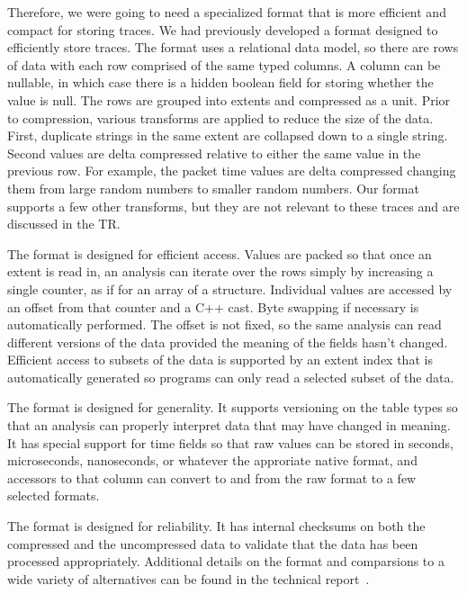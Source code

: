 Therefore, we were going to need a specialized format that is more
efficient and compact for storing traces.  We had previously developed
a format designed to efficiently store traces.  The format uses a
relational data model, so there are rows of data with each row
comprised of the same typed columns.  A column can be nullable, in
which case there is a hidden boolean field for storing whether the
value is null.  The rows are grouped into extents and compressed as a
unit.  Prior to compression, various transforms are applied to reduce
the size of the data.  First, duplicate strings in the same extent are
collapsed down to a single string.  Second values are delta compressed
relative to either the same value in the previous row.  For example,
the packet time values are delta compressed changing them from large
random numbers to smaller random numbers.  Our format supports a few
other transforms, but they are not relevant to these traces and are
discussed in the TR.

The format is designed for efficient access. Values are packed so that
once an extent is read in, an analysis can iterate over the rows
simply by increasing a single counter, as if for an array of a
structure.  Individual values are accessed by an offset from that
counter and a C++ cast.  Byte swapping if necessary is automatically
performed.  The offset is not fixed, so the same analysis can read
different versions of the data provided the meaning of the fields
hasn't changed.  Efficient access to subsets of the data is supported
by an extent index that is automatically generated so programs can
only read a selected subset of the data.

The format is designed for generality. It supports versioning on the
table types so that an analysis can properly interpret data that may
have changed in meaning.  It has special support for time fields so
that raw values can be stored in seconds, microseconds, nanoseconds,
or whatever the approriate native format, and accessors to that column
can convert to and from the raw format to a few selected formats.

The format is designed for reliability.  It has internal checksums on
both the compressed and the uncompressed data to validate that the
data has been processed appropriately.  Additional details on the
format and comparsions to a wide variety of alternatives can be found
in the technical report~\cite{DSTechnicalReportSnapshot}.
